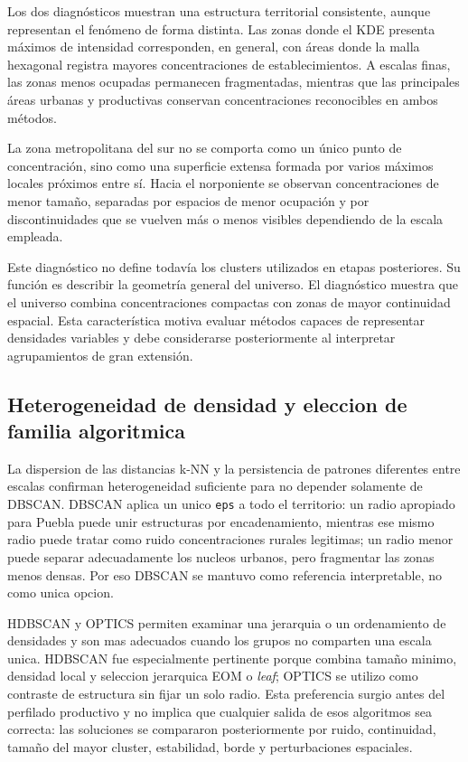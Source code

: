 \documentclass[11pt,letterpaper]{article}
\begin{document}
Los dos diagnósticos muestran una estructura territorial consistente, aunque representan el fenómeno de forma distinta. Las zonas donde el KDE presenta máximos de intensidad corresponden, en general, con áreas donde la malla hexagonal registra mayores concentraciones de establecimientos. A escalas finas, las zonas menos ocupadas permanecen fragmentadas, mientras que las principales áreas urbanas y productivas conservan concentraciones reconocibles en ambos métodos.

La zona metropolitana del sur no se comporta como un único punto de concentración, sino como una superficie extensa formada por varios máximos locales próximos entre sí. Hacia el norponiente se observan concentraciones de menor tamaño, separadas por espacios de menor ocupación y por discontinuidades que se vuelven más o menos visibles dependiendo de la escala empleada.

Este diagnóstico no define todavía los clusters utilizados en etapas posteriores. Su función es describir la geometría general del universo. El diagnóstico muestra que el universo combina concentraciones compactas con zonas de mayor continuidad espacial. Esta característica motiva evaluar métodos capaces de representar densidades variables y debe considerarse posteriormente al interpretar agrupamientos de gran extensión.


\subsection{Heterogeneidad de densidad y eleccion de familia algoritmica}

La dispersion de las distancias k-NN y la persistencia de patrones diferentes entre escalas confirman heterogeneidad suficiente para no depender solamente de DBSCAN. DBSCAN aplica un unico \texttt{eps} a todo el territorio: un radio apropiado para Puebla puede unir estructuras por encadenamiento, mientras ese mismo radio puede tratar como ruido concentraciones rurales legitimas; un radio menor puede separar adecuadamente los nucleos urbanos, pero fragmentar las zonas menos densas. Por eso DBSCAN se mantuvo como referencia interpretable, no como unica opcion.

HDBSCAN y OPTICS permiten examinar una jerarquia o un ordenamiento de densidades y son mas adecuados cuando los grupos no comparten una escala unica. HDBSCAN fue especialmente pertinente porque combina tamaño minimo, densidad local y seleccion jerarquica EOM o \emph{leaf}; OPTICS se utilizo como contraste de estructura sin fijar un solo radio. Esta preferencia surgio antes del perfilado productivo y no implica que cualquier salida de esos algoritmos sea correcta: las soluciones se compararon posteriormente por ruido, continuidad, tamaño del mayor cluster, estabilidad, borde y perturbaciones espaciales.
\end{document}
